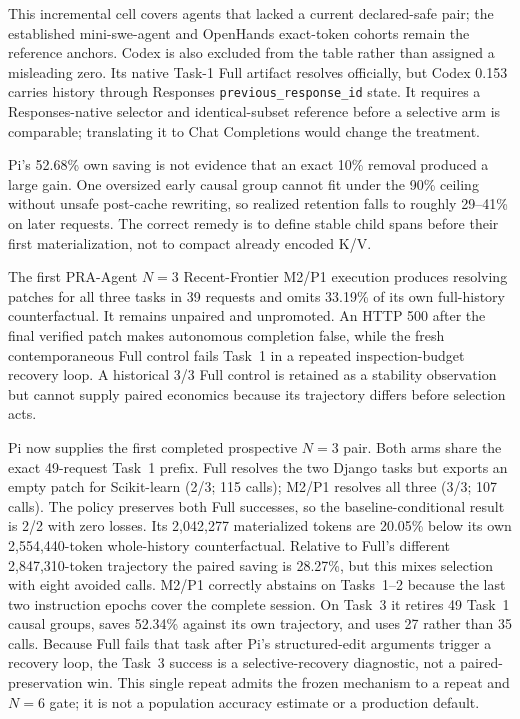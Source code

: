 \documentclass[11pt]{article}
\begin{document}
This incremental cell covers agents that lacked a current declared-safe pair;
the established mini-swe-agent and OpenHands exact-token cohorts remain the
reference anchors.  Codex is also excluded from the table rather than assigned
a misleading zero.  Its native Task-1 Full artifact resolves officially, but
Codex 0.153 carries history through Responses \texttt{previous\_response\_id}
state.  It requires a Responses-native selector and identical-subset reference
before a selective arm is comparable; translating it to Chat Completions would
change the treatment.

Pi's 52.68\% own saving is not evidence that an exact 10\% removal produced a
large gain.  One oversized early causal group cannot fit under the 90\% ceiling
without unsafe post-cache rewriting, so realized retention falls to roughly
29--41\% on later requests.  The correct remedy is to define stable child spans
before their first materialization, not to compact already encoded K/V.

The first PRA-Agent $N=3$ Recent-Frontier M2/P1 execution produces resolving
patches for all three tasks in 39 requests and omits 33.19\% of its own
full-history counterfactual.  It remains unpaired and unpromoted.  An HTTP 500
after the final verified patch makes autonomous completion false, while the
fresh contemporaneous Full control fails Task~1 in a repeated
inspection-budget recovery loop.  A historical 3/3 Full control is retained
as a stability observation but cannot supply paired economics because its
trajectory differs before selection acts.

Pi now supplies the first completed prospective $N=3$ pair.  Both arms share
the exact 49-request Task~1 prefix.  Full resolves the two Django tasks but
exports an empty patch for Scikit-learn (2/3; 115 calls); M2/P1 resolves all
three (3/3; 107 calls).  The policy preserves both Full successes, so the
baseline-conditional result is 2/2 with zero losses.  Its 2,042,277
materialized tokens are 20.05\% below its own 2,554,440-token whole-history
counterfactual.  Relative to Full's different 2,847,310-token trajectory the
paired saving is 28.27\%, but this mixes selection with eight avoided calls.
M2/P1 correctly abstains on Tasks~1--2 because the last two instruction epochs
cover the complete session.  On Task~3 it retires 49 Task~1 causal groups,
saves 52.34\% against its own trajectory, and uses 27 rather than 35 calls.
Because Full fails that task after Pi's structured-edit arguments trigger a
recovery loop, the Task~3 success is a selective-recovery diagnostic, not a
paired-preservation win.  This single repeat admits the frozen mechanism to a
repeat and $N=6$ gate; it is not a population accuracy estimate or a production
default.
\end{document}
